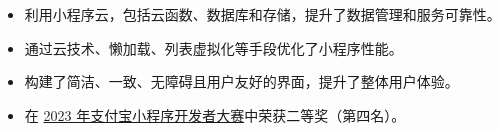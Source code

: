 

\begin{itemize}[nosep]
  \item 利用小程序云，包括云函数、数据库和存储，提升了数据管理和服务可靠性。
  \item 通过云技术、懒加载、列表虚拟化等手段优化了小程序性能。
  \item 构建了简洁、一致、无障碍且用户友好的界面，提升了整体用户体验。
  \item 在 \href{https://open.alipay.com/portal/forum/competition/2023}{2023 年支付宝小程序开发者大赛}中荣获二等奖（第四名）。
\end{itemize}
